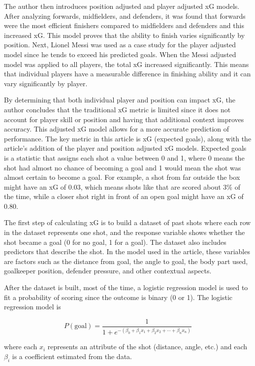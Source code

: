 \documentclass[
  11pt,
  letterpaper,
  DIV=11,
  numbers=noendperiod]{scrartcl}
\begin{document}
The author then introduces position adjusted and player adjusted xG
models. After analyzing forwards, midfielders, and defenders, it was
found that forwards were the most efficient finishers compared to
midfielders and defenders and this increased xG. This model proves that
the ability to finish varies significantly by position. Next, Lionel
Messi was used as a case study for the player adjusted model since he
tends to exceed his predicted goals. When the Messi adjusted model was
applied to all players, the total xG increased significantly. This means
that individual players have a measurable difference in finishing
ability and it can vary significantly by player.

By determining that both individual player and position can impact xG,
the author concludes that the traditional xG metric is limited since it
does not account for player skill or position and having that additional
context improves accuracy. This adjusted xG model allows for a more
accurate prediction of performance. The key metric in this article is xG
(expected goals), along with the article's addition of the player and
position adjusted xG models. Expected goals is a statistic that assigns
each shot a value between 0 and 1, where 0 means the shot had almost no
chance of becoming a goal and 1 would mean the shot was almost certain
to become a goal. For example, a shot from far outside the box might
have an xG of 0.03, which means shots like that are scored about 3\% of
the time, while a closer shot right in front of an open goal might have
an xG of 0.80.

The first step of calculating xG is to build a dataset of past shots
where each row in the dataset represents one shot, and the response
variable shows whether the shot became a goal (0 for no goal, 1 for a
goal). The dataset also includes predictors that describe the shot. In
the model used in the article, these variables are factors such as the
distance from goal, the angle to goal, the body part used, goalkeeper
position, defender pressure, and other contextual aspects.

After the dataset is built, most of the time, a logistic regression
model is used to fit a probability of scoring since the outcome is
binary (0 or 1). The logistic regression model is

\[
P(\text{goal}) = \frac{1}{1 + e^{-(\beta_0 + \beta_1 x_1 + \beta_2 x_2 + \cdots + \beta_n x_n)}}
\]

where each \(x_i\) represents an attribute of the shot (distance, angle,
etc.) and each \(\beta_i\) is a coefficient estimated from the data.
\end{document}
